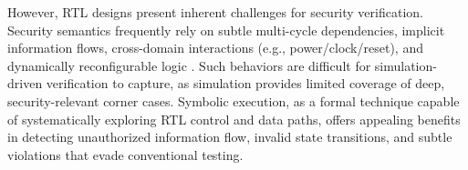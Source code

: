\documentclass[conference]{IEEEtran}
\begin{document}
However, RTL designs present inherent challenges for security verification. Security semantics frequently rely on subtle multi-cycle dependencies, implicit information flows, cross-domain interactions (e.g., power/clock/reset), and dynamically reconfigurable logic \cite{farahmandi_system--chip_2020}. Such behaviors are difficult for simulation-driven verification to capture, as simulation provides limited coverage of deep, security-relevant corner cases. Symbolic execution, as a formal technique capable of systematically exploring RTL control and data paths, offers appealing benefits in detecting unauthorized information flow, invalid state transitions, and subtle violations that evade conventional testing\cite{co-verif}\cite{soc-verif}.

\end{document}
